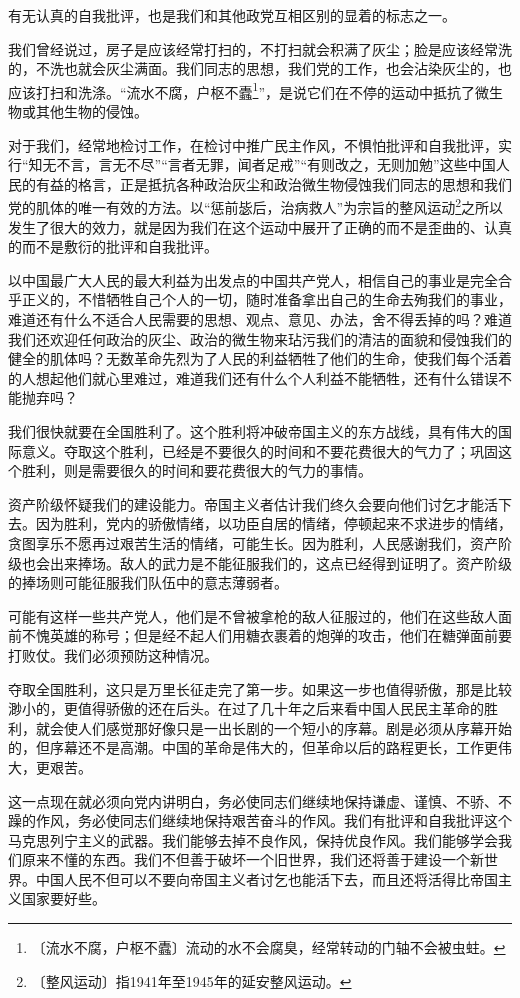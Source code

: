 \documentclass[12pt,UTF-8,openany]{ctexbook}
\begin{document}
\begin{large}
    
    有无认真的自我批评，也是我们和其他政党互相区别的显着的标志之一。
    
    我们曾经说过，房子是应该经常打扫的，不打扫就会积满了灰尘；脸是应该经常洗的，不洗也就会灰尘满面。我们同志的思想，我们党的工作，也会沾染灰尘的，也应该打扫和洗涤。“流水不腐，户枢不蠹\footnote{〔流水不腐，户枢不蠹〕流动的水不会腐臭，经常转动的门轴不会被虫蛀。}”，是说它们在不停的运动中抵抗了微生物或其他生物的侵蚀。
    
    对于我们，经常地检讨工作，在检讨中推广民主作风，不惧怕批评和自我批评，实行“知无不言，言无不尽”“言者无罪，闻者足戒”“有则改之，无则加勉”这些中国人民的有益的格言，正是抵抗各种政治灰尘和政治微生物侵蚀我们同志的思想和我们党的肌体的唯一有效的方法。以“惩前毖后，治病救人”为宗旨的整风运动\footnote{〔整风运动〕指1941年至1945年的延安整风运动。}之所以发生了很大的效力，就是因为我们在这个运动中展开了正确的而不是歪曲的、认真的而不是敷衍的批评和自我批评。
    
    以中国最广大人民的最大利益为出发点的中国共产党人，相信自己的事业是完全合乎正义的，不惜牺牲自己个人的一切，随时准备拿出自己的生命去殉我们的事业，难道还有什么不适合人民需要的思想、观点、意见、办法，舍不得丢掉的吗？难道我们还欢迎任何政治的灰尘、政治的微生物来玷污我们的清洁的面貌和侵蚀我们的健全的肌体吗？无数革命先烈为了人民的利益牺牲了他们的生命，使我们每个活着的人想起他们就心里难过，难道我们还有什么个人利益不能牺牲，还有什么错误不能抛弃吗？
    
    我们很快就要在全国胜利了。这个胜利将冲破帝国主义的东方战线，具有伟大的国际意义。夺取这个胜利，已经是不要很久的时间和不要花费很大的气力了；巩固这个胜利，则是需要很久的时间和要花费很大的气力的事情。
    
    资产阶级怀疑我们的建设能力。帝国主义者估计我们终久会要向他们讨乞才能活下去。因为胜利，党内的骄傲情绪，以功臣自居的情绪，停顿起来不求进步的情绪，贪图享乐不愿再过艰苦生活的情绪，可能生长。因为胜利，人民感谢我们，资产阶级也会出来捧场。敌人的武力是不能征服我们的，这点已经得到证明了。资产阶级的捧场则可能征服我们队伍中的意志薄弱者。
    
    可能有这样一些共产党人，他们是不曾被拿枪的敌人征服过的，他们在这些敌人面前不愧英雄的称号；但是经不起人们用糖衣裹着的炮弹的攻击，他们在糖弹面前要打败仗。我们必须预防这种情况。
    
    夺取全国胜利，这只是万里长征走完了第一步。如果这一步也值得骄傲，那是比较渺小的，更值得骄傲的还在后头。在过了几十年之后来看中国人民民主革命的胜利，就会使人们感觉那好像只是一出长剧的一个短小的序幕。剧是必须从序幕开始的，但序幕还不是高潮。中国的革命是伟大的，但革命以后的路程更长，工作更伟大，更艰苦。
    
    这一点现在就必须向党内讲明白，务必使同志们继续地保持谦虚、谨慎、不骄、不躁的作风，务必使同志们继续地保持艰苦奋斗的作风。我们有批评和自我批评这个马克思列宁主义的武器。我们能够去掉不良作风，保持优良作风。我们能够学会我们原来不懂的东西。我们不但善于破坏一个旧世界，我们还将善于建设一个新世界。中国人民不但可以不要向帝国主义者讨乞也能活下去，而且还将活得比帝国主义国家要好些。
    
\end{large}
\end{document}
